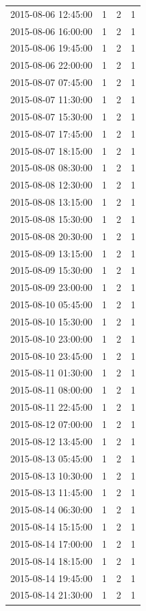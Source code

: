 \begin{tabular}{lrrr}
2015-08-06 12:45:00 & 1 & 2 & 1 \\
2015-08-06 16:00:00 & 1 & 2 & 1 \\
2015-08-06 19:45:00 & 1 & 2 & 1 \\
2015-08-06 22:00:00 & 1 & 2 & 1 \\
2015-08-07 07:45:00 & 1 & 2 & 1 \\
2015-08-07 11:30:00 & 1 & 2 & 1 \\
2015-08-07 15:30:00 & 1 & 2 & 1 \\
2015-08-07 17:45:00 & 1 & 2 & 1 \\
2015-08-07 18:15:00 & 1 & 2 & 1 \\
2015-08-08 08:30:00 & 1 & 2 & 1 \\
2015-08-08 12:30:00 & 1 & 2 & 1 \\
2015-08-08 13:15:00 & 1 & 2 & 1 \\
2015-08-08 15:30:00 & 1 & 2 & 1 \\
2015-08-08 20:30:00 & 1 & 2 & 1 \\
2015-08-09 13:15:00 & 1 & 2 & 1 \\
2015-08-09 15:30:00 & 1 & 2 & 1 \\
2015-08-09 23:00:00 & 1 & 2 & 1 \\
2015-08-10 05:45:00 & 1 & 2 & 1 \\
2015-08-10 15:30:00 & 1 & 2 & 1 \\
2015-08-10 23:00:00 & 1 & 2 & 1 \\
2015-08-10 23:45:00 & 1 & 2 & 1 \\
2015-08-11 01:30:00 & 1 & 2 & 1 \\
2015-08-11 08:00:00 & 1 & 2 & 1 \\
2015-08-11 22:45:00 & 1 & 2 & 1 \\
2015-08-12 07:00:00 & 1 & 2 & 1 \\
2015-08-12 13:45:00 & 1 & 2 & 1 \\
2015-08-13 05:45:00 & 1 & 2 & 1 \\
2015-08-13 10:30:00 & 1 & 2 & 1 \\
2015-08-13 11:45:00 & 1 & 2 & 1 \\
2015-08-14 06:30:00 & 1 & 2 & 1 \\
2015-08-14 15:15:00 & 1 & 2 & 1 \\
2015-08-14 17:00:00 & 1 & 2 & 1 \\
2015-08-14 18:15:00 & 1 & 2 & 1 \\
2015-08-14 19:45:00 & 1 & 2 & 1 \\
2015-08-14 21:30:00 & 1 & 2 & 1 \\

\end{tabular}
